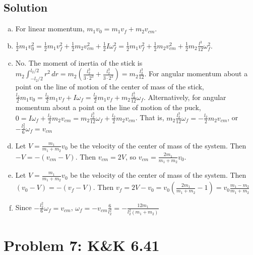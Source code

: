 \documentclass[solutions]{esg8012pset}
\renewcommand{\d}{\,d}
\begin{document}
\subsection*{Solution}
  \begin{enumerate}[(a)]
    \item For linear momentum, $m_1 v_0 = m_1 v_f + m_2 v_{cm}$.
    \item $\frac{1}{2}m_1v_0^2 = \frac{1}{2} m_1 v_f^2 + \frac{1}{2}m_2 v_{cm}^2 + \frac{1}{2} I \omega_f^2 = \frac{1}{2} m_1 v_f^2 + \frac{1}{2}m_2 v_{cm}^2 + \frac{1}{2} m_2 \frac{l^3}{12} \omega_f^2$.
    \item No. The moment of inertia of the stick is $m_2\int_{-l_2/2}^{l_2/2} r^2 \d r = m_2\left(\frac{l_2^3}{3\cdot 2^3} + \frac{l_2^3}{3\cdot 2^3}\right) = m_2 \frac{l_2^3}{12}$.  For angular momentum about a point on the line of motion of the center of mass of the stick, $\frac{l_2}{2} m_1 v_0 = \frac{l_2}{2} m_1 v_f + I\omega_f = \frac{l_2}{2} m_1 v_f + m_2 \frac{l_2^3}{12}\omega_f$.  Alternatively, for angular momentum about a point on the line of motion of the puck, $0 = I\omega_f + \frac{l_2}{2} m_2 v_{cm} = m_2 \frac{l_2^3}{12}\omega_f + \frac{l_2}{2} m_2 v_{cm}$.  That is, $m_2 \frac{l_2^3}{12}\omega_f = -\frac{l_2}{2} m_2 v_{cm}$, or $-\frac{l_2^2}{6}\omega_f = v_{cm}$
    \item Let $V = \frac{m_1}{m_1 + m_2}v_0$ be the velocity of the center of mass of the system.  Then $-V = -(v_{cm} - V)$.  Then $v_{cm} = 2V$, so $v_{cm} = \frac{2m_1}{m_1 + m_2}v_0$.
    \item Let $V = \frac{m_1}{m_1 + m_2}v_0$ be the velocity of the center of mass of the system.  Then $(v_0 - V) = -(v_f - V)$.  Then $v_f = 2V-v_0 = v_0\left(\frac{2m_1}{m_1 + m_2} - 1\right) = v_0\frac{m_1 - m_2}{m_1 + m_2}$
    \item Since $-\frac{l_2^2}{6}\omega_f = v_{cm}$, $\omega_f = -v_{cm}\frac{6}{l_2^2} = -\frac{12m_1}{l_2^2(m_1 + m_2)}$
  \end{enumerate}
\section*{Problem 7: K\&K 6.41}
\end{document}
